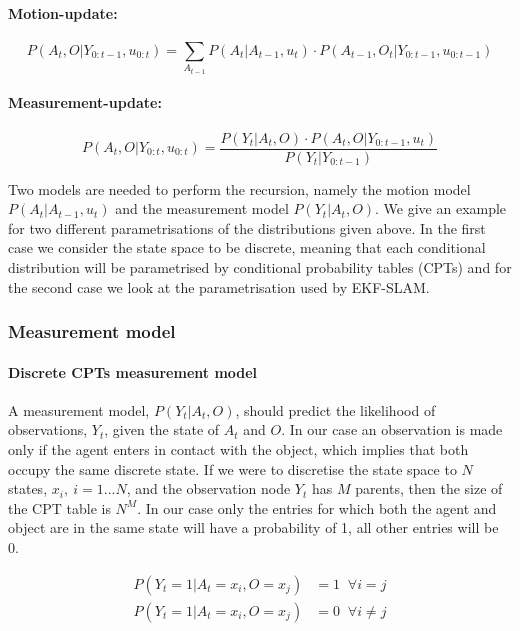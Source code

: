\paragraph{Motion-update:}
\begin{equation}\label{eq:time-update}
   P(A_t,O|Y_{0:t-1},u_{0:t}) = \sum_{A_{t-1}} P(A_t|A_{t-1},u_t) \cdot  P(A_{t-1},O_t|Y_{0:t-1},u_{0:t-1})
\end{equation}

\paragraph{Measurement-update:}
\begin{equation}\label{eq:measurement-update}
   P(A_t,O|Y_{0:t},u_{0:t}) = \frac{P(Y_t|A_t,O)\cdot P(A_t,O|Y_{0:t-1},u_{t}) }{P(Y_t|Y_{0:t-1})   }
\end{equation}

Two models are needed to perform the recursion, namely the motion model $P(A_t|A_{t-1},u_t)$ and the measurement model
$P(Y_t|A_t,O)$. We give an example for two different parametrisations of the distributions given above. In the first
case we consider the state space to be discrete, meaning that each conditional distribution will be parametrised by 
conditional probability tables (CPTs) and for the second case we look at the parametrisation used by EKF-SLAM. 


\subsubsection{Measurement model}\label{subsub:measurement-model}

\paragraph{Discrete CPTs measurement model}

A measurement model, $P(Y_t|A_t,O)$, should predict the likelihood of observations, $Y_t$, given the state of $A_t$ and $O$. 
In our case an observation is made only if the agent enters in contact with the object, which implies that both
occupy the same discrete state. If we were to discretise the state space to $N$ states, $x_i,\:i=1...N$, and the observation node $Y_t$  
has $M$ parents, then the size of the CPT table is $N^{M}$. In our case only the
entries for which both the agent and object are in the same state will have a probability of 1, all other entries will be 0.

\begin{align*}\label{eq:disc-measurement_function}
 P(Y_t=1|A_t=x_i,O=x_j) &= 1\;\; \forall i = j \\
 P(Y_t=1|A_t=x_i,O=x_j) &= 0\;\; \forall i \not= j \\
\end{align*}
 
